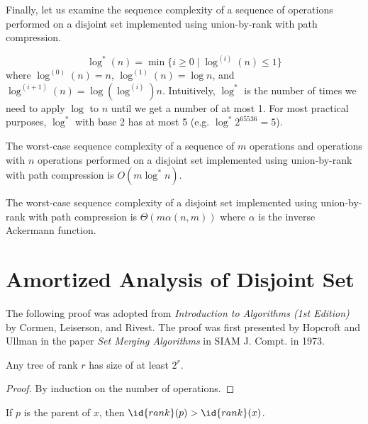 Finally, let us examine the sequence complexity of a sequence of operations performed on a disjoint set implemented using union-by-rank with path compression.

\begin{definition}
    $$
    \log^*(n) = \min \{ i \geq 0 \mid \log^{(i)} (n) \leq 1 \}
    $$
    where $\log^{(0)}(n) = n$, $\log^{(1)}(n) = \log n$, and $\log^{(i+1)}(n) = \log(\log^{(i)})n$. Intuitively, $\log^*$ is the number of times we need to apply $\log$ to $n$ until we get a number of at most 1. For most practical purposes, $\log^*$ with base 2 has at most 5 (e.g. $\log^* 2^{65536} = 5$).
\end{definition}

\begin{theorem}
    The worst-case sequence complexity of a sequence of $m$  operations and  operations with $n$  operations performed on a disjoint set implemented using union-by-rank with path compression is $O(m \log^* n)$. 
\end{theorem}

\begin{theorem}
    The worst-case sequence complexity of a disjoint set implemented using union-by-rank with path compression is $\Theta(m\alpha(n,m))$ where $\alpha$ is the inverse Ackermann function.
\end{theorem}

\section{Amortized Analysis of Disjoint Set}

The following proof was adopted from \textit{Introduction to Algorithms (1st Edition)} by Cormen, Leiserson, and Rivest. The proof was first presented by Hopcroft and Ullman in the paper \textit{Set Merging Algorithms} in SIAM J. Compt. in 1973.

\begin{lemma} \label{lem:logstar1}
    Any tree of rank $r$ has size of at least $2^r$.
\end{lemma}

\begin{proof}
    By induction on the number of  operations.
\end{proof}

\begin{lemma} \label{lem:logstar2}
    If $p$ is the parent of $x$, then $\id{rank}(p) > \id{rank}(x)$. 
\end{lemma}

